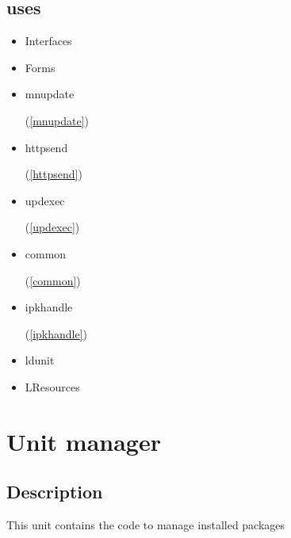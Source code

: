 \documentclass{report}
\begin{document}
\section{uses}
\begin{itemize}
\item \begin{ttfamily}Interfaces\end{ttfamily}\item \begin{ttfamily}Forms\end{ttfamily}\item \begin{ttfamily}mnupdate\end{ttfamily}(\ref{mnupdate})\item \begin{ttfamily}httpsend\end{ttfamily}(\ref{httpsend})\item \begin{ttfamily}updexec\end{ttfamily}(\ref{updexec})\item \begin{ttfamily}common\end{ttfamily}(\ref{common})\item \begin{ttfamily}ipkhandle\end{ttfamily}(\ref{ipkhandle})\item \begin{ttfamily}ldunit\end{ttfamily}\item \begin{ttfamily}LResources\end{ttfamily}\end{itemize}
\chapter{Unit manager}
\label{manager}
\section{Description}
This unit contains the code to manage installed packages
\end{document}
